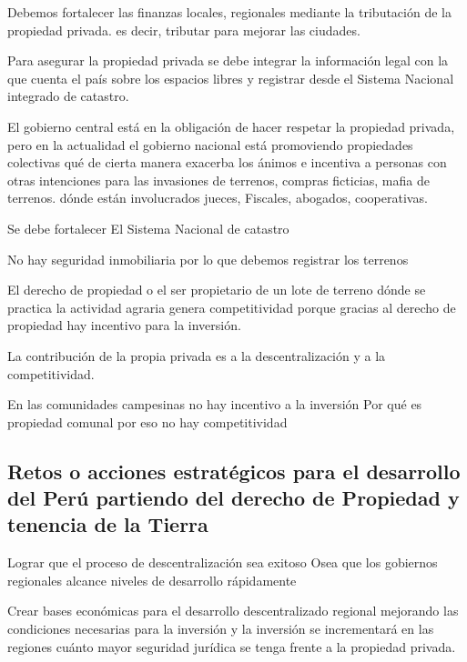 \documentclass[
  a4paper,
]{article}
\begin{document}
Debemos fortalecer las finanzas locales, regionales mediante la
tributación de la propiedad privada. es decir, tributar para mejorar las
ciudades.

Para asegurar la propiedad privada se debe integrar la información legal
con la que cuenta el país sobre los espacios libres y registrar desde el
Sistema Nacional integrado de catastro.

El gobierno central está en la obligación de hacer respetar la propiedad
privada, pero en la actualidad el gobierno nacional está promoviendo
propiedades colectivas qué de cierta manera exacerba los ánimos e
incentiva a personas con otras intenciones para las invasiones de
terrenos, compras ficticias, mafia de terrenos. dónde están involucrados
jueces, Fiscales, abogados, cooperativas.

Se debe fortalecer El Sistema Nacional de catastro

No hay seguridad inmobiliaria por lo que debemos registrar los terrenos

El derecho de propiedad o el ser propietario de un lote de terreno dónde
se practica la actividad agraria genera competitividad porque gracias al
derecho de propiedad hay incentivo para la inversión.

La contribución de la propia privada es a la descentralización y a la
competitividad.

En las comunidades campesinas no hay incentivo a la inversión Por qué es
propiedad comunal por eso no hay competitividad

\hypertarget{retos-o-acciones-estratuxe9gicos-para-el-desarrollo-del-peruxfa-partiendo-del-derecho-de-propiedad-y-tenencia-de-la-tierra}{%
\subsection{Retos o acciones estratégicos para el desarrollo del Perú
partiendo del derecho de Propiedad y tenencia de la
Tierra}\label{retos-o-acciones-estratuxe9gicos-para-el-desarrollo-del-peruxfa-partiendo-del-derecho-de-propiedad-y-tenencia-de-la-tierra}}

Lograr que el proceso de descentralización sea exitoso Osea que los
gobiernos regionales alcance niveles de desarrollo rápidamente

Crear bases económicas para el desarrollo descentralizado regional
mejorando las condiciones necesarias para la inversión y la inversión se
incrementará en las regiones cuánto mayor seguridad jurídica se tenga
frente a la propiedad privada.
\end{document}

